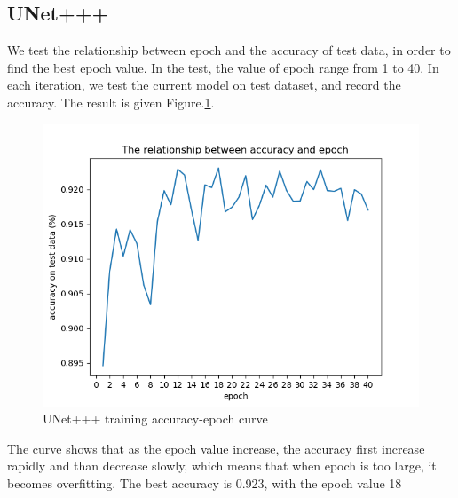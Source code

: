 \subsection{UNet+++}
We test the relationship between epoch and the accuracy of test data, in order to find the best epoch value. In the test, the value of epoch range from 1 to 40. 
In each iteration, we test the current model on test dataset, and record the accuracy. The result is given Figure.\ref{fig:unetpppCurve}.

\begin{figure}[!htpb]
\includegraphics[width=\linewidth]{figuras/epoch_accuracy.png}
\caption{UNet+++ training accuracy-epoch curve}
\label{fig:unetpppCurve}
\end{figure}

The curve shows that as the epoch value increase, the accuracy first increase rapidly and than decrease slowly, 
which means that when epoch is too large, it becomes overfitting.
The best accuracy is 0.923, with the epoch value 18
